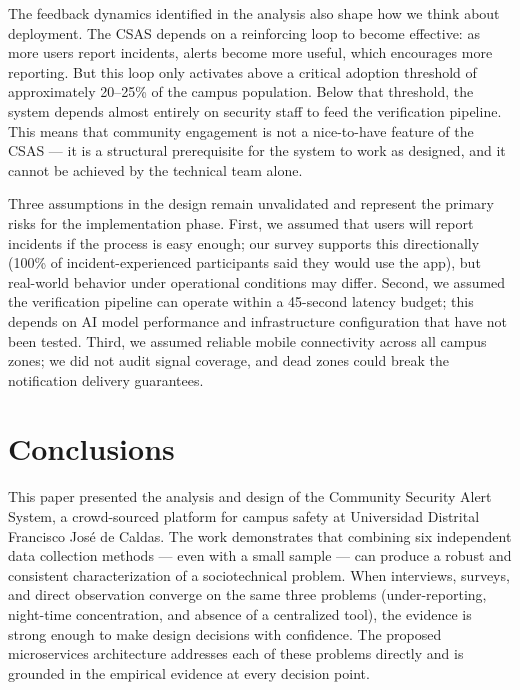 \documentclass[10pt,twocolumn]{article}
\begin{document}
The feedback dynamics identified in the analysis also shape how we think about
deployment. The CSAS depends on a reinforcing loop to become effective: as more
users report incidents, alerts become more useful, which encourages more reporting.
But this loop only activates above a critical adoption threshold of approximately
20--25\% of the campus population. Below that threshold, the system depends almost
entirely on security staff to feed the verification pipeline. This means that
community engagement is not a nice-to-have feature of the CSAS --- it is a
structural prerequisite for the system to work as designed, and it cannot be
achieved by the technical team alone.

Three assumptions in the design remain unvalidated and represent the primary
risks for the implementation phase. First, we assumed that users will report
incidents if the process is easy enough; our survey supports this directionally
(100\% of incident-experienced participants said they would use the app), but
real-world behavior under operational conditions may differ. Second, we assumed
the verification pipeline can operate within a 45-second latency budget; this
depends on AI model performance and infrastructure configuration that have not
been tested. Third, we assumed reliable mobile connectivity across all campus
zones; we did not audit signal coverage, and dead zones could break the
notification delivery guarantees.

\section{Conclusions}

This paper presented the analysis and design of the Community Security Alert
System, a crowd-sourced platform for campus safety at Universidad Distrital
Francisco Jos\'e de Caldas. The work demonstrates that combining six independent
data collection methods --- even with a small sample --- can produce a robust
and consistent characterization of a sociotechnical problem. When interviews,
surveys, and direct observation converge on the same three problems (under-reporting,
night-time concentration, and absence of a centralized tool), the evidence is
strong enough to make design decisions with confidence. The proposed microservices
architecture addresses each of these problems directly and is grounded in the
empirical evidence at every decision point.
\end{document}
